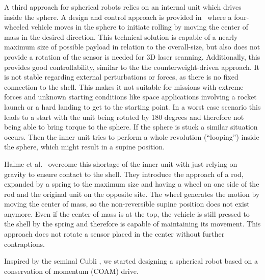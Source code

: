 A third approach for spherical robots relies on an internal unit which drives inside the sphere.
A design and control approach is provided in~\cite{soa6} where a four-wheeled vehicle moves in the sphere to initiate rolling by moving the center of mass in the desired direction.
This technical solution is capable of a nearly maximum size of possible payload in relation to the overall-size, but also does not provide a rotation of the sensor is needed for 3D laser scanning.
Additionally, this provides good controllability, similar to the the counterweight-driven approach.
It is not stable regarding external perturbations or forces, as there is no fixed connection to the shell.
This makes it not suitable for missions with extreme forces and unknown starting conditions like space applications involving a rocket launch or a hard landing to get to the starting point.
In a worst case scenario this leads to a start with the unit being rotated by 180 degrees and therefore not being able to bring torque to the sphere.
If the sphere is stuck a similar situation occurs.
Then the inner unit tries to perform a whole revolution (``looping'') inside the sphere, which might result in a supine position.

Halme et al.~\cite{soa7} overcome this shortage of the inner unit with just relying on gravity to ensure contact to the shell.
They introduce the approach of a rod, expanded by a spring to the maximum size and having a wheel on one side of the rod and the original unit on the opposite site.
The wheel generates the motion by moving the center of mass, so the non-reversible supine position does not exist anymore.
Even if the center of mass is at the top, the vehicle is still pressed to the shell by the spring and therefore is capable of maintaining its movement.
This approach does not rotate a sensor placed in the center without further contraptions.

Inspired by the seminal Cubli  \cite{cubliIROS12}, we started designing a spherical robot based on a conservation of momentum (COAM) drive. 